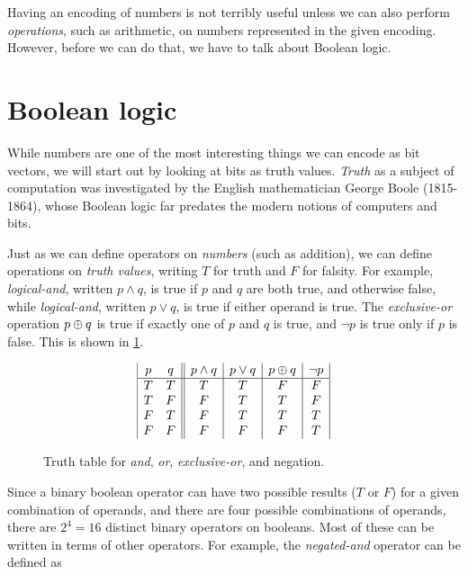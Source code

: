 Having an encoding of numbers is not terribly useful unless we can
also perform \emph{operations}, such as arithmetic, on numbers
represented in the given encoding.  However, before we can do that, we
have to talk about Boolean logic.

\section{Boolean logic}
\label{sec:boolean-logic}

While numbers are one of the most interesting things we can encode as
bit vectors, we will start out by looking at bits as truth values.
\emph{Truth} as a subject of computation was investigated by the
English mathematician George Boole (1815-1864), whose Boolean logic
far predates the modern notions of computers and bits.

Just as we can define operators on \emph{numbers} (such as addition),
we can define operations on \emph{truth values}, writing $T$ for truth
and $F$ for falsity.  For example, \emph{logical-and}, written
$p \land q$, is true if $p$ and $q$ are both true, and otherwise
false, while \emph{logical-and}, written $p \lor q$, is true if either
operand is true.  The \emph{exclusive-or} operation $p \oplus q$ is
true if exactly one of $p$ and $q$ is true, and $\neg p$ is true only
if $p$ is false.  This is shown in \cref{fig:truth-tables}.

\begin{figure}
  \centering

  \begin{displaymath}
\begin{array}{|c c||c|c|c|c|}
p & q & p \land q & p \lor q & p \oplus q & \neg p \\
\hline
T & T & T & T & F & F\\
T & F & F & T & T & F\\
F & T & F & T & T & T\\
F & F & F & F & F & T\\
\end{array}
\end{displaymath}
  \caption{Truth table for \emph{and}, \emph{or}, \emph{exclusive-or}, and negation.}
  \label{fig:truth-tables}
\end{figure}

Since a binary boolean operator can have two possible results ($T$ or
$F$) for a given combination of operands, and there are four possible
combinations of operands, there are $2^{4}=16$ distinct binary
operators on booleans.  Most of these can be written in terms of other
operators.  For example, the \emph{negated-and} operator can be defined as

